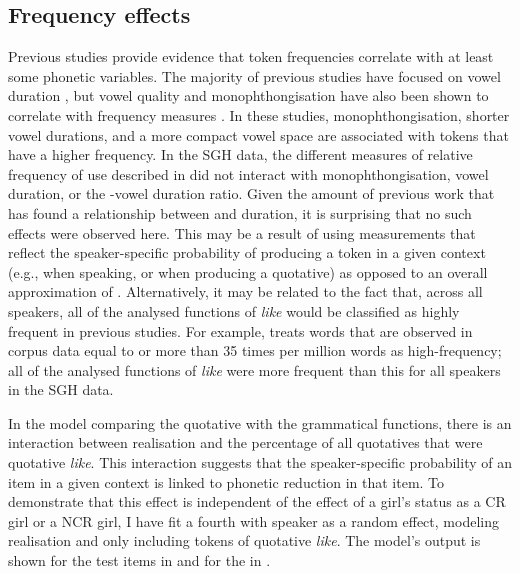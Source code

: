 \subsection{Frequency effects}
\largerpage[-1]
Previous studies provide evidence that token frequencies correlate with at least some phonetic variables. The majority of previous studies have focused on vowel duration \citep{bybee2001,jurafskyetal2002,gahl-thyme}, but vowel quality and monophthongisation have also been shown to correlate with frequency measures \citep{munson2007,oprah1999}. In these studies, monophthongisation, shorter vowel durations, and a more compact vowel space are associated with tokens that have a higher frequency. In the SGH data, the different measures of relative frequency of use described in  did not interact with monophthongisation, vowel duration, or the -vowel duration ratio. Given the amount of previous work that has found a relationship between  and duration, it is surprising that no such effects were observed here. This may be a result of using measurements that reflect the speaker-specific probability of producing a token in a given context (e.g., when speaking, or when producing a quotative) as opposed to an overall approximation of . Alternatively, it may be related to the fact that, across all speakers, all of the analysed functions of \textit{like} would be classified as highly frequent in previous studies. For example, \citet{bybee2002} treats words that are observed in corpus data equal to or more than 35 times per million words as high-frequency; all of the analysed functions of \textit{like} were more frequent than this for all speakers in the SGH data. 

In the model comparing the quotative with the grammatical functions, there is an interaction between  realisation and the percentage of all quotatives that were quotative \textit{like}. This interaction suggests that the speaker-specific probability of an item in a given context is linked to phonetic reduction in that item. To demonstrate that this effect is independent of the effect of a girl's status as a CR girl or a NCR girl, I have fit a fourth  with speaker as a random effect, modeling  realisation and only including tokens of quotative \textit{like}. The model's output is shown for the test items in  and for the  in .

